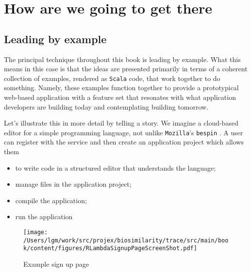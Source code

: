 \section{How are we going to get there}

\subsection{Leading by example}

The principal technique throughout this book is leading by
example. What this means in this case is that the ideas are presented
primarily in terms of a coherent collection of examples, rendered as
\texttt{Scala} code, that work together to do something. Namely, these
examples function together to provide a prototypical web-based
application with a feature set that resonates with what application
developers are building today and contemplating building tomorrow.

Let's illustrate this in more detail by telling a story. We imagine a
cloud-based editor for a simple programming language, not unlike
\texttt{Mozilla}'s \texttt{bespin} . A user can register with the
service and then create an application project which allows them
\begin{itemize}
   \item to write code in a structured editor that understands the language;
   \item manage files in the application project;
   \item compile the application;
   \item run the application
\end{itemize}

\begin{figure}[tbp]
\begin{center}
{ \texttt{[image: /Users/lgm/work/src/projex/biosimilarity/trace/src/main/book/content/figures/RLambdaSignupPageScreenShot.pdf]} }
\caption{ Example sign up page }
\end{center}
\end{figure}


